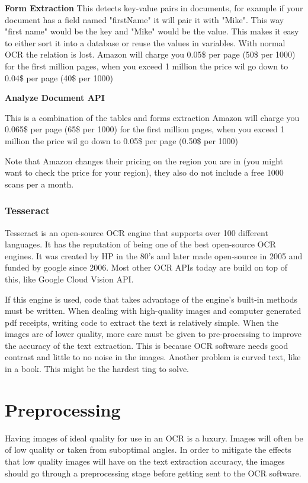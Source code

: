 \textbf{Form Extraction}
This detects key-value pairs in documents, for example if your document has a field named "firstName" it will pair
it with "Mike".
This way "first name" would be the key and "Mike" would be the value.
This makes it easy to either sort it into a database or reuse the values in variables.
With normal OCR the relation is lost.
Amazon will charge you 0.05\$ per page (50\$ per 1000) for the first million pages, when you exceed 1 million the price wil go down to
0.04\$ per page (40\$ per 1000)

\textbf{Analyze Document API}

This is a combination of the tables and forms extraction
Amazon will charge you 0.065\$ per page (65\$ per 1000) for the first million pages, when you exceed 1 million the price wil go down to
0.05\$ per page (0.50\$ per 1000)

Note that Amazon changes their pricing on the region you are in (you might want to check the price for your region), they also do not include a free 1000 scans per a month.

\subsubsection{Tesseract}\label{subsubsec:Tesseract}
Tesseract is an open-source OCR engine that supports over 100 different languages.
It has the reputation of being one of the best open-source OCR engines.
It was created by HP in the 80's and later made open-source in 2005 and funded by google since 2006.
Most other OCR APIs today are build on top of this, like Google Cloud Vision API.

If this engine is used, code that takes advantage of the engine's built-in methods must be written.
When dealing with high-quality images and computer generated pdf receipts, writing code to extract the text is relatively simple.
When the images are of lower quality, more care must be given to pre-processing to improve the accuracy of the text
extraction.
This is because OCR software needs good contrast and little to no noise in the images.
Another problem is curved text, like in a book.
This might be the hardest ting to solve.

\section{Preprocessing}\label{sec:preprocessing}
Having images of ideal quality for use in an OCR is a luxury.
Images will often be of low quality or taken from suboptimal angles.
In order to mitigate the effects that low quality images will have on the text extraction accuracy, the images should go through a preprocessing stage before getting sent to the OCR software.

